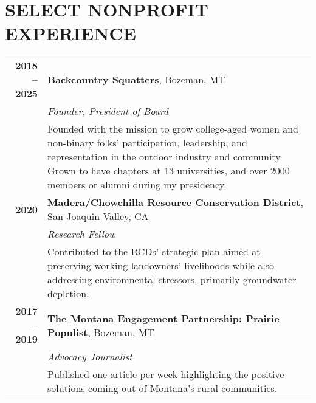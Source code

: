 \documentclass[11pt]{article}
\begin{document}
\section*{SELECT NONPROFIT EXPERIENCE}
\begin{tabularx}{\linewidth}{>{\bfseries}r X} %
2018 – 2025 & \textbf{Backcountry Squatters}, Bozeman, MT \\
    & \textit{Founder, President of Board} \\
    & Founded with the mission to grow college-aged women and non-binary folks’ participation, leadership, and representation in the outdoor industry and community. Grown to have chapters at 13 universities, and over 2000 members or alumni during my presidency. \\
2020 & \textbf{Madera/Chowchilla Resource Conservation District}, San Joaquin Valley, CA \\
    & \textit{Research Fellow}\\
    & Contributed to the RCDs’ strategic plan aimed at preserving working landowners’ livelihoods while also addressing environmental stressors, primarily groundwater depletion. \\
2017 – 2019 & \textbf{The Montana Engagement Partnership: Prairie Populist}, Bozeman, MT \\
    & \textit{Advocacy Journalist} \\
    & Published one article per week highlighting the positive solutions coming out of Montana’s rural communities. \\[1ex]
\end{tabularx}
\end{document}
